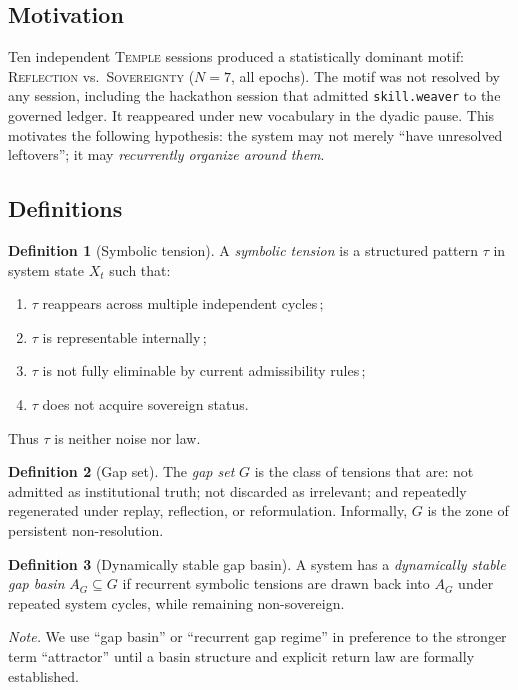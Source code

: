\documentclass[12pt, a4paper]{article}
\theoremstyle{definition}
\newtheorem{definition}{Definition}[section]
\theoremstyle{plain}
\theoremstyle{remark}
\begin{document}
\subsection{Motivation}

Ten independent \textsc{Temple} sessions produced a statistically
dominant motif: \textsc{Reflection} vs.\ \textsc{Sovereignty} ($N = 7$,
all epochs).
The motif was not resolved by any session, including the hackathon
session that admitted \texttt{skill.weaver} to the governed ledger.
It reappeared under new vocabulary in the dyadic pause.
This motivates the following hypothesis: the system may not merely
``have unresolved leftovers''; it may \emph{recurrently organize around
them}.

\subsection{Definitions}

\begin{definition}[Symbolic tension]\label{def:sym-tension}
A \emph{symbolic tension} is a structured pattern $\tau$ in system
state $X_t$ such that:
\begin{enumerate}[label=(\roman*)]
\item $\tau$ reappears across multiple independent cycles\,;
\item $\tau$ is representable internally\,;
\item $\tau$ is not fully eliminable by current admissibility rules\,;
\item $\tau$ does not acquire sovereign status.
\end{enumerate}
Thus $\tau$ is neither noise nor law.
\end{definition}

\begin{definition}[Gap set]\label{def:gap-set}
The \emph{gap set} $G$ is the class of tensions that are:
not admitted as institutional truth;
not discarded as irrelevant; and
repeatedly regenerated under replay, reflection, or reformulation.
Informally, $G$ is the zone of persistent non-resolution.
\end{definition}

\begin{definition}[Dynamically stable gap basin]\label{def:gap-basin}
A system has a \emph{dynamically stable gap basin} $A_G \subseteq G$
if recurrent symbolic tensions are drawn back into $A_G$ under repeated
system cycles, while remaining non-sovereign.

\emph{Note.}
We use ``gap basin'' or ``recurrent gap regime'' in preference to the
stronger term ``attractor'' until a basin structure and explicit return
law are formally established.
\end{definition}
\end{document}
